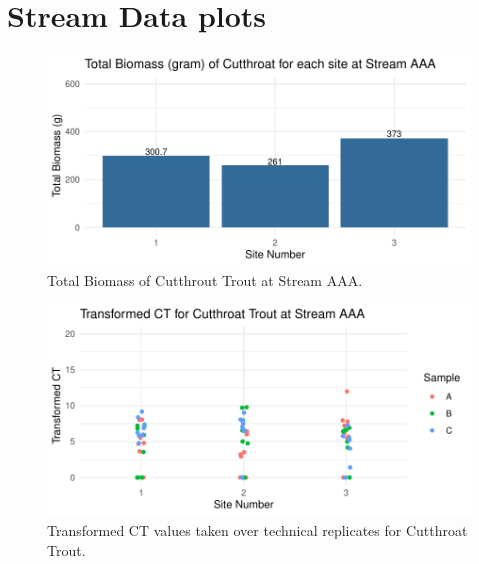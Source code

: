 \label{chapter: Additional Models}



\section{Stream Data plots}

\begin{figure}[H]
\centering
\includegraphics{AppendixImages/AAA_Ct_new.pdf}
\caption{\hspace{1mm}     Total Biomass of Cutthrout Trout at Stream AAA.}
\label{fig:testAAAbiom}
\end{figure}


\begin{figure}[H]
\centering
\includegraphics{AppendixImages/AAA_ct_tct.pdf}
\caption{  \hspace{1mm}   Transformed CT values taken over technical replicates for Cutthroat Trout.}
\label{fig:AAA_ct}
\end{figure}




